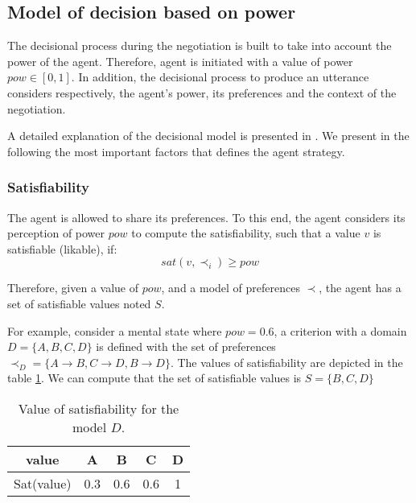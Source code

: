 \documentclass{llncs}
\begin{document}
		 \subsection{Model of decision based on power}
		The decisional process during the negotiation is built to take into account the power of the agent. Therefore, agent is initiated with a value of power $pow \in [0,1]$. In addition, the decisional process to produce an utterance considers respectively, the agent's power, its preferences and the context of the negotiation.  
		
		A detailed explanation of the decisional model is presented in \cite{} . We present in the following the most important factors that defines the agent strategy.
		
		\subsubsection{Satisfiability }
		\label{sec:sat}
		The agent is allowed to share its preferences. %
		To this end, the agent considers its perception of power $pow$ to compute the satisfiability, such that a value $v$ is satisfiable (likable), if:  
		\begin{equation}
		 	sat(v, \prec_i) \geq pow
		\end{equation}
	
		Therefore, given a value of $pow$, and a model of preferences $\prec$, the agent has a set of satisfiable values noted $S$. 
		
		\par For example, consider a mental state where $pow =0.6$, a criterion with a domain $D =\{A, B, C, D\}$ is defined with the set of preferences $ \prec_D = \{A \rightarrow  B, C \rightarrow  D , B \rightarrow D \}$. The values of satisfiability are depicted in the table \ref{sat}. We can compute that the set of satisfiable values is $ S = \{B, C, D\}$ 
			 \begin{table}
			 	\centering
			 	\begin{tabular}{ |c|c|c|c|c| }
			 		\hline				
			 		value & A & B & C & D \\
			 		\hline

			 		\hline
			 		Sat(value) & 0.3 & 0.6 & 0.6 & 1 \\
			 		\hline
			 		
			 	\end{tabular}
			 	\caption{Value of satisfiability for the model $D$.}
			 	\label{sat}
			 \end{table}
		
\end{document}
